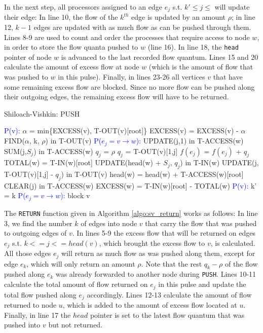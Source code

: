 \documentclass[a4paper,10pt, twocolumn]{article}
\begin{document}
In the next step, all processors assigned to an edge $e_j$ s.t. $k'\leq j \leq$ will update their edge: In line 10, the flow of the $k^{th}$ edge is updated by an amount $\rho$; in line 12, $k-1$ edges are updated with as much flow as can be pushed through them. Lines 8-9 are used to count and order the processes that require access to node $w$, in order to store the flow quanta pushed to $w$ (line 16). In line 18, the \lstinline|head| pointer of node $w$ is advanced to the last recorded flow quantum. Lines 15 and 20 calculate the amount of excess flow at node $w$ (which is the amount of flow that was pushed to $w$ in this pulse). Finally, in lines 23-26 all vertices $v$ that have some remaining excess flow are blocked. Since no more flow can be pushed along their outgoing edges, the remaining excess flow will have to be returned.

\begin{algorithm}
\caption{Shiloach-Vishkin: PUSH}
\label{algo:sv_push}
\begin{algorithmic}[1]
		\State \textcolor{blue}{P(v):}
		\State $\alpha$ = min\{EXCESS(v), T-OUT(v)[root]\} 
		\State EXCESS(v) = EXCESS(v) - $\alpha$
		\State FIND($\alpha$, k, $\rho$) in T-OUT(v)
		\State \textcolor{blue}{P($e_j = v \rightarrow w$):}
 		\State UPDATE(j,1) in T-ACCESS(w)
		\State SUM(j,$S_j$) in T-ACCESS(w)
			$q_j$ = $\rho$
		\Else
			\State $q_j$ = T-OUT(v)[1,j]
		\EndIf
		\State $f(e_j)$ = $f(e_j)$ + $q_j$
		\State TOTAL(w) = T-IN(w)[root]
		\State UPDATE(head(w) + $S_j$, $q_j$) in T-IN(w)
		\State UPDATE(j, T-OUT(v)[1,j] - $q_j$) in T-OUT(v)
		\State head(w) = head(w) + T-ACCESS(w)[root] 
		\State CLEAR(j) in T-ACCESS(w)
		\State EXCESS(w) = T-IN(w)[root] - TOTAL(w)
		\EndIf
		\State \textcolor{blue}{P(v):} k' = k
		\State \textcolor{blue}{P($e_j = v \rightarrow w$):}
			\State block v
		\EndIf
 	\EndFunction
\end{algorithmic}
\end{algorithm}

The \lstinline|RETURN| function given in Algorithm \ref{algo:sv_return} works as follows: In line 3, we find the number $k$ of edges into node $v$ that carry the flow that was pushed to outgoing edges of $v$. In lines 5-9 the excess flow that will be returned on edges $e_j$ s.t. $k<=j<=head(v)$, which brought the excess flow to $v$, is calculated. All those edges $e_j$ will return as much flow as was pushed along them, except for edge $e_k$, which will only return an amount $\rho$. Note that the rest $q_k - \rho$ of the flow pushed along $e_k$ was already forwarded to another node during \lstinline|PUSH|. Lines 10-11 calculate the total amount of flow returned on $e_j$ in this pulse and update the total flow pushed along $e_j$ accordingly. Lines 12-13 calculate the amount of flow returned to node $u$, which is added to the amount of excess flow located at $u$. Finally, in line 17 the $head$ pointer is set to the latest flow quantum that was pushed into $v$ but not returned.
\end{document}
